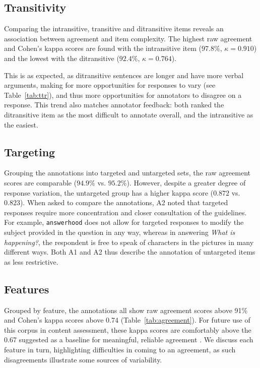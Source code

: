 \documentclass[11pt,a4paper]{article}
\newcommand{\feat}[1]{\texttt{#1}}
\newcommand{\md}[1]{\marginpar{\scriptsize MD: #1}}
\renewcommand{\marginpar}[1]{}
\begin{document}
\subsection{Transitivity} 
\label{sec:transitivity}
Comparing the intransitive, transitive and ditransitive items reveals an association between agreement and item complexity. The highest raw agreement and Cohen's kappa scores are found with the intransitive item ($97.8\%$, $\kappa=0.910$) and the lowest with the ditransitive ($92.4\%$, $\kappa=0.764$). 

This is as expected, as ditransitive sentences are longer and have more verbal arguments, making for more opportunities for responses to vary (see Table~\ref{tab:ttr}), and thus more opportunities for annotators to disagree on a response. This trend also matches annotator feedback: both ranked the ditransitive item as the most difficult to annotate overall, and the intransitive as the easiest.

\subsection{Targeting} 
\label{sec:prompts}
Grouping the annotations into targeted and untargeted sets, the raw agreement scores are comparable ($94.9\%$ vs. $95.2\%$). However, despite a greater degree of response variation, the untargeted group has a higher kappa score ($0.872$ vs. $0.823$).
%
%
When asked to compare the annotations, A2 noted that targeted responses require more concentration and closer consultation of the guidelines. For example, \feat{answerhood} does not allow for targeted responses to modify the subject provided in the question in any way, whereas in answering \textit{What is happening?}, the respondent is free to speak of characters in the pictures in many different ways.  Both A1 and A2 thus describe the annotation of untargeted items as less restrictive.

\subsection{Features} 
\label{sec:features}
Grouped by feature, the annotations all show raw agreement scores above 91\% and Cohen's kappa scores above 0.74 (Table~\ref{tab:agreement}). For future use of this corpus in content assessment, these kappa scores are comfortably above the 0.67 suggested as a baseline for meaningful, reliable agreement \citep{landis1977measurement, artstein:massimo:2008}.  We discuss each feature in turn, highlighting difficulties in coming to an agreement, as such disagreements illustrate some sources of variability.
\end{document}
